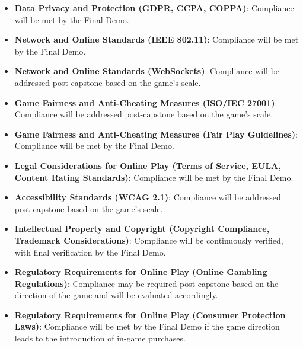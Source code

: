 \begin{itemize}
\item \textbf{Data Privacy and Protection (GDPR, CCPA, COPPA)}: Compliance will be met by the Final Demo.
\item \textbf{Network and Online Standards (IEEE 802.11)}: Compliance will be met by the Final Demo.
\item \textbf{Network and Online Standards (WebSockets)}: Compliance will be addressed post-capstone based on the game's scale.
\item \textbf{Game Fairness and Anti-Cheating Measures (ISO/IEC 27001)}: Compliance will be addressed post-capstone based on the game's scale.
\item \textbf{Game Fairness and Anti-Cheating Measures (Fair Play Guidelines)}: Compliance will be met by the Final Demo.
\item \textbf{Legal Considerations for Online Play (Terms of Service, EULA, Content Rating Standards)}: Compliance will be met by the Final Demo.
\item \textbf{Accessibility Standards (WCAG 2.1)}: Compliance will be addressed post-capstone based on the game's scale.
\item \textbf{Intellectual Property and Copyright (Copyright Compliance, Trademark Considerations)}: Compliance will be continuously verified, with final verification by the Final Demo.
\item \textbf{Regulatory Requirements for Online Play (Online Gambling Regulations)}: Compliance may be required post-capstone based on the direction of the game and will be evaluated accordingly.
\item \textbf{Regulatory Requirements for Online Play (Consumer Protection Laws)}: Compliance will be met by the Final Demo if the game direction leads to the introduction of in-game purchases.
\end{itemize}